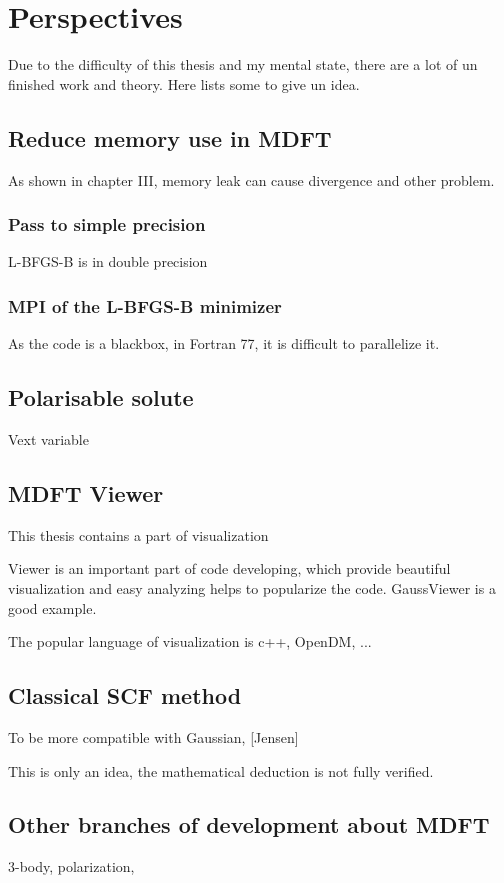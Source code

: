 
\chapter{Perspectives\label{chpt:perspectives}}

Due to the difficulty of this thesis and my mental state, there are
a lot of un finished work and theory. Here lists some to give un idea.


\section{Reduce memory use in MDFT}

As shown in chapter III, memory leak can cause divergence and other
problem.


\subsection{Pass to simple precision}

L-BFGS-B is in double precision


\subsection{MPI of the L-BFGS-B minimizer}

As the code is a blackbox, in Fortran 77, it is difficult to parallelize
it. 


\section{Polarisable solute}

Vext variable


\section{MDFT Viewer}

This thesis contains a part of visualization

Viewer is an important part of code developing, which provide beautiful
visualization and easy analyzing helps to popularize the code. GaussViewer
is a good example.

The popular language of visualization is c++, OpenDM, ...


\section{Classical SCF method}

To be more compatible with Gaussian, {[}Jensen{]}

This is only an idea, the mathematical deduction is not fully verified.


\section{Other branches of development about MDFT}

3-body, polarization, 
